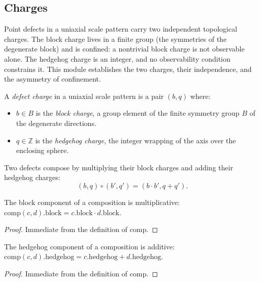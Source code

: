 \subsection{Charges}

Point defects in a uniaxial scale pattern carry two independent topological charges. The block charge lives in a finite group (the symmetries of the degenerate block) and is confined: a nontrivial block charge is not observable alone. The hedgehog charge is an integer, and no observability condition constrains it. This module establishes the two charges, their independence, and the asymmetry of confinement.

\begin{definition}
A \emph{defect charge} in a uniaxial scale pattern is a pair $(b, q)$ where:
\begin{itemize}
\item $b \in B$ is the \emph{block charge}, a group element of the finite symmetry group $B$ of the degenerate directions.
\item $q \in \mathbb{Z}$ is the \emph{hedgehog charge}, the integer wrapping of the axis over the enclosing sphere.
\end{itemize}
\end{definition}

\begin{definition}
Two defects compose by multiplying their block charges and adding their hedgehog charges:
\[ (b, q) \circ (b', q') = (b \cdot b', q + q'). \]
\end{definition}

\begin{theorem}
The block component of a composition is multiplicative: $\mathrm{comp}(c, d).\mathrm{block} = c.\mathrm{block} \cdot d.\mathrm{block}$.
\end{theorem}

\begin{proof}
Immediate from the definition of $\mathrm{comp}$.
\end{proof}

\begin{theorem}
The hedgehog component of a composition is additive: $\mathrm{comp}(c, d).\mathrm{hedgehog} = c.\mathrm{hedgehog} + d.\mathrm{hedgehog}$.
\end{theorem}

\begin{proof}
Immediate from the definition of $\mathrm{comp}$.
\end{proof}

